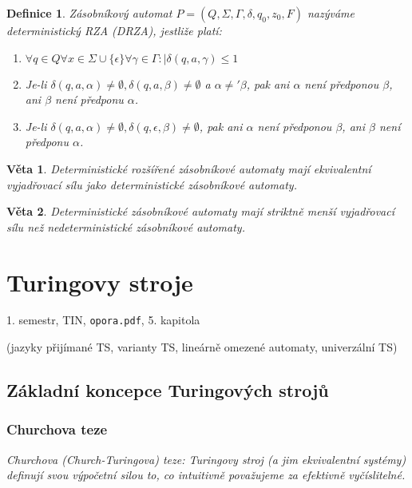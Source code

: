\documentclass[a4paper, 11pt]{report}
\newtheorem{mydef}{Definice}[chapter]
\newtheorem{veta}{Věta}[chapter]
\begin{document}
\begin{mydef}
Zásobníkový automat $P = (Q, \Sigma, \Gamma, \delta, q_0, z_0, F)$ nazýváme \emph{deterministický} RZA (DRZA), jestliže platí:
\begin{enumerate}
	\item $\forall q \in Q \forall x \in \Sigma \cup \{\epsilon\} \forall \gamma \in \Gamma: |\delta(q, a, \gamma) \leq 1$
	\item Je-li $\delta(q, a, \alpha) \not= \emptyset, \delta(q, a, \beta) \not= \emptyset$ a $\alpha \not='\beta$, pak ani $\alpha$ není předponou $\beta$, ani $\beta$ není předponu $\alpha$.
	\item Je-li $\delta(q, a, \alpha) \not= \emptyset, \delta(q, \epsilon, \beta) \not= \emptyset$, pak ani $\alpha$ není předponou $\beta$, ani $\beta$ není předponu $\alpha$.
\end{enumerate}
\end{mydef}

\begin{veta}
Deterministické rozšířené zásobníkové automaty mají ekvivalentní vyjadřovací sílu jako deterministické zásobníkové automaty.
\end{veta}

\begin{veta}
Deterministické zásobníkové automaty mají striktně menší vyjadřovací sílu než nedeterministické zásobníkové automaty.
\end{veta}







\chapter{Turingovy stroje} \label{cha:22}
1. semestr, TIN, \texttt{opora.pdf}, 5. kapitola

(jazyky přijímané TS, varianty TS, lineárně omezené automaty, univerzální TS)

\section{Základní koncepce Turingových strojů}
\subsection{Churchova teze}
\emph{Churchova (Church-Turingova) teze: Turingovy stroj (a jim ekvivalentní systémy) definují svou výpočetní silou to, co intuitivně považujeme za efektivně vyčíslitelné.}
\end{document}
